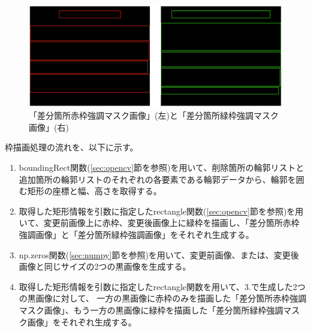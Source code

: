 \begin{figure}[tp]
    \begin{center}
        \includegraphics[width=1.0\columnwidth]{image/4_img_diff_highlight_mask.png}
        \caption{「差分箇所赤枠強調マスク画像」(左)と「差分箇所緑枠強調マスク画像」(右)}
        \label{fig: img_diff_highlight_mask}
    \end{center}
\end{figure}
\par
枠描画処理の流れを、以下に示す。
\begin{enumerate}
    \item boundingRect関数(\ref{sec:opencv}節を参照)を用いて、削除箇所の輪郭リストと追加箇所の輪郭リストのそれぞれの各要素である輪郭データから、輪郭を囲む矩形の座標と幅、高さを取得する。
    \item 取得した矩形情報を引数に指定したrectangle関数(\ref{sec:opencv}節を参照)を用いて、変更前画像上に赤枠、変更後画像上に緑枠を描画し、「差分箇所赤枠強調画像」と「差分箇所緑枠強調画像」をそれぞれ生成する。
    \item np.zeros関数(\ref{sec:numpy}節を参照)を用いて、変更前画像、または、変更後画像と同じサイズの2つの黒画像を生成する。
    \item 取得した矩形情報を引数に指定したrectangle関数を用いて、3.で生成した2つの黒画像に対して、
          一方の黒画像に赤枠のみを描画した「差分箇所赤枠強調マスク画像」、もう一方の黒画像に緑枠を描画した「差分箇所緑枠強調マスク画像」をそれぞれ生成する。
\end{enumerate}



